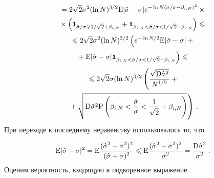 \begin{multicols}{2}
\begin{multline*}
{}=2\sqrt{2}\sigma^2(\ln N)^{{3}/{2}}\mbox{E}|\hat{\sigma}-\sigma|
e^{-\ln N\left({\hat{\sigma}}/{\sigma}-\beta_{i,N}\right)^2}\times{}\\[1pt]
{}\times
\left(\mbox{{\small \tt {1}}\hspace{-1.5mm}{\tt 1}}_{\hat{\sigma}/{\sigma}\geqslant{1}/{\sqrt{2}}+\beta_{i,N}}+
\mbox{{\small \tt {1}}\hspace{-1.5mm}{\tt 1}}_{\beta_{i,N}<{\hat{\sigma}}/{\sigma}< 1/\sqrt{2}+\beta_{i,N}}\right)\leqslant{}\\[1pt]
{}\leqslant2\sqrt{2}\sigma^2(\ln N)^{{3}/{2}}\left(e^{-\ln N/2}\mbox{E}|\hat{\sigma}-\sigma|+{}\right.\\[1pt]
\left.{}+
\mbox{E}|\hat{\sigma}-\sigma|\mbox{{\small \tt {1}}\hspace{-1.5mm}{\tt 1}}_{\beta_{i,N}<{\hat{\sigma}}/\sigma<1/\sqrt{2}+\beta_{i,N}}\right)\leqslant{}
\end{multline*}
\begin{multline*}
{}\leqslant2\sqrt{2}\sigma(\ln N)^{3/2}\left(\displaystyle\frac{\displaystyle \sqrt{\mbox{D}\hat{\sigma}^2}\mathstrut}{\displaystyle N^{1/2}\mathstrut}+{}\right.\\
\left.{}+
\sqrt{\mbox{D}\hat{\sigma}^2\mbox{P}\left(\beta_{i,N}<
\displaystyle\frac{\displaystyle \hat{\sigma}\mathstrut}{\displaystyle \sigma\mathstrut}<\displaystyle\frac{\displaystyle 1\mathstrut}{\displaystyle \sqrt{2}\mathstrut}+\beta_{i,N}\right)}\right)\,.
\end{multline*}
При переходе к последнему неравенству использовалось то, что

\noindent
$$
\mbox{E}|\hat{\sigma}-\sigma|^2=\mbox{E}\displaystyle\frac{\displaystyle (\hat{\sigma}^2-\sigma^2)^2\mathstrut}{\displaystyle (\hat{\sigma}+\sigma)^2\mathstrut}\leqslant
\mbox{E}\displaystyle\frac{\displaystyle (\hat{\sigma}^2-\sigma^2)^2\mathstrut}{\displaystyle \sigma^2\mathstrut}=\displaystyle\frac{\displaystyle \mbox{D}\hat{\sigma}^2\mathstrut}{\displaystyle \sigma^2\mathstrut}\,.
$$
Оценим вероятность, входящую в подкоренное выражение.


\end{multicols}
